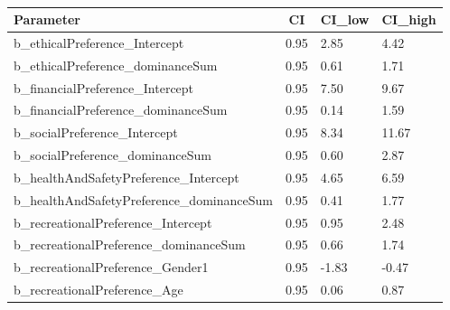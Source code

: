 \documentclass[
  english,
  ,doc, 12pt, a4paper,floatsintext]{apa7}
\begin{document}
\begin{table}[tbp]

\begin{center}
\begin{threeparttable}

\caption{\label{tab:unnamed-chunk-6}}

\begin{tabular}{llll}
\toprule
Parameter & \multicolumn{1}{c}{CI} & \multicolumn{1}{c}{CI\_low} & \multicolumn{1}{c}{CI\_high}\\
\midrule
b\_ethicalPreference\_Intercept & 0.95 & 2.85 & 4.42\\
b\_ethicalPreference\_dominanceSum & 0.95 & 0.61 & 1.71\\
b\_financialPreference\_Intercept & 0.95 & 7.50 & 9.67\\
b\_financialPreference\_dominanceSum & 0.95 & 0.14 & 1.59\\
b\_socialPreference\_Intercept & 0.95 & 8.34 & 11.67\\
b\_socialPreference\_dominanceSum & 0.95 & 0.60 & 2.87\\
b\_healthAndSafetyPreference\_Intercept & 0.95 & 4.65 & 6.59\\
b\_healthAndSafetyPreference\_dominanceSum & 0.95 & 0.41 & 1.77\\
b\_recreationalPreference\_Intercept & 0.95 & 0.95 & 2.48\\
b\_recreationalPreference\_dominanceSum & 0.95 & 0.66 & 1.74\\
b\_recreationalPreference\_Gender1 & 0.95 & -1.83 & -0.47\\
b\_recreationalPreference\_Age & 0.95 & 0.06 & 0.87\\
\bottomrule
\end{tabular}

\end{threeparttable}
\end{center}

\end{table}
\end{document}
